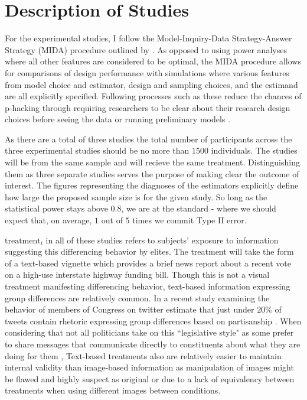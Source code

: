 \documentclass[12pt]{article}
\begin{document}
\section{Description of Studies}
For the experimental studies, I follow the Model-Inquiry-Data Strategy-Answer Strategy (MIDA) procedure outlined by \citet{blair_et-al_2019}. As opposed to using power analyses where all other features are considered to be optimal, the MIDA procedure allows for comparisons of design performance with simulations where various features from model choice and estimator, design and sampling choices, and the estimand are all explicitly specified. Following processes such as these reduce the chances of p-hacking through requiring researchers to be clear about their research design choices before seeing the data or running preliminary models \citep{brodeur_et-al_2022_wp}.

As there are a total of three studies the total number of participants across the three experimental studies should be no more than $1500$ individuals. The studies will be from the same sample and will recieve the same treatment. Distinguishing them as three separate studies serves the purpose of making clear the outcome of interest. The figures representing the diagnoses of the estimators explicitly define how large the proposed sample size is for the given study. So long as the statistical power stays above $0.8$, we are at the standard - where we should expect that, on average, $1$ out of $5$ times we commit Type II error.

$\text{treatment}_i$ in all of these studies refers to subjects' exposure to information suggesting this differencing behavior by elites. The treatment will take the form of a text-based vignette which provides a brief news report about a recent vote on a high-use interstate highway funding bill. Though this is not a visual treatment manifesting differencing behavior, text-based information expressing group differences are relatively common. In a recent study examining the behavior of members of Congress on twitter estimate that just under $20\%$ of tweets contain rhetoric expressing group differences based on partisanship \citep{ballard_et-al_2022_lsq}. When considering that not all politicians take on this ``legislative style" as some prefer to share messages that communicate directly to constituents about what they are doing for them \citep{bernhard_sulkin_2018}, Text-based treatments also are relatively easier to maintain internal validity than image-based information as manipulation of images might be flawed and highly suspect as original or due to a lack of equivalency between treatments when using different images between conditions.
\end{document}
